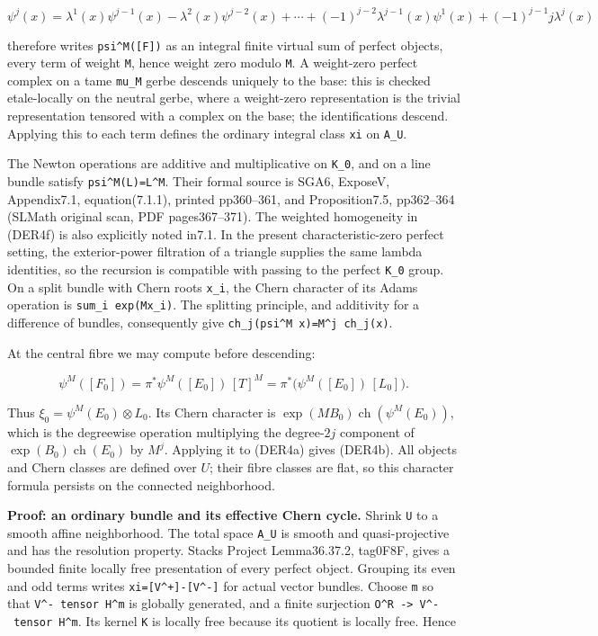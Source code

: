 \documentclass[11pt,a4paper]{article}
\theoremstyle{definition}
\begin{document}
\[
 \psi^j(x)=\lambda^1(x)\psi^{j-1}(x)
 -\lambda^2(x)\psi^{j-2}(x)+\cdots
 +(-1)^{j-2}\lambda^{j-1}(x)\psi^1(x)
 +(-1)^{j-1}j\lambda^j(x)
\tag{DER4f}
\]

therefore writes \texttt{psi\^{}M({[}F{]})} as an integral finite
virtual sum of perfect objects, every term of weight \texttt{M}, hence
weight zero modulo \texttt{M}. A weight-zero perfect complex on a tame
\texttt{mu\_M} gerbe descends uniquely to the base: this is checked
etale-locally on the neutral gerbe, where a weight-zero representation
is the trivial representation tensored with a complex on the base; the
identifications descend. Applying this to each term defines the ordinary
integral class \texttt{xi} on \texttt{A\_U}.

The Newton operations are additive and multiplicative on \texttt{K\_0},
and on a line bundle satisfy \texttt{psi\^{}M(L)=L\^{}M}. Their formal
source is SGA6, ExposeV, Appendix7.1, equation(7.1.1), printed
pp360--361, and Proposition7.5, pp362--364 (SLMath original scan, PDF
pages367--371). The weighted homogeneity in (DER4f) is also explicitly
noted in7.1. In the present characteristic-zero perfect setting, the
exterior-power filtration of a triangle supplies the same lambda
identities, so the recursion is compatible with passing to the perfect
\texttt{K\_0} group. On a split bundle with Chern roots \texttt{x\_i},
the Chern character of its Adams operation is
\texttt{sum\_i\ exp(Mx\_i)}. The splitting principle, and additivity for
a difference of bundles, consequently give
\texttt{ch\_j(psi\^{}M\ x)=M\^{}j\ ch\_j(x)}.

At the central fibre we may compute before descending:

\[
 \psi^M([F_0])
 =\pi^*\psi^M([E_0])\,[T]^M
 =\pi^*\bigl(\psi^M([E_0])\,[L_0]\bigr).
\]

Thus \(\xi_0=\psi^M(E_0)\otimes L_0\). Its Chern character is
\(\exp(MB_0)\operatorname{ch}(\psi^M(E_0))\), which is the degreewise
operation multiplying the degree-\(2j\) component of
\(\exp(B_0)\operatorname{ch}(E_0)\) by \(M^j\). Applying it to (DER4a)
gives (DER4b). All objects and Chern classes are defined over \(U\);
their fibre classes are flat, so this character formula persists on the
connected neighborhood.

\textbf{Proof: an ordinary bundle and its effective Chern cycle.} Shrink
\texttt{U} to a smooth affine neighborhood. The total space
\texttt{A\_U} is smooth and quasi-projective and has the resolution
property. Stacks Project Lemma36.37.2, tag0F8F, gives a bounded finite
locally free presentation of every perfect object. Grouping its even and
odd terms writes \texttt{xi={[}V\^{}+{]}-{[}V\^{}-{]}} for actual vector
bundles. Choose \texttt{m} so that \texttt{V\^{}-\ tensor\ H\^{}m} is
globally generated, and a finite surjection
\texttt{O\^{}R\ -\textgreater{}\ V\^{}-\ tensor\ H\^{}m}. Its kernel
\texttt{K} is locally free because its quotient is locally free. Hence
\end{document}
